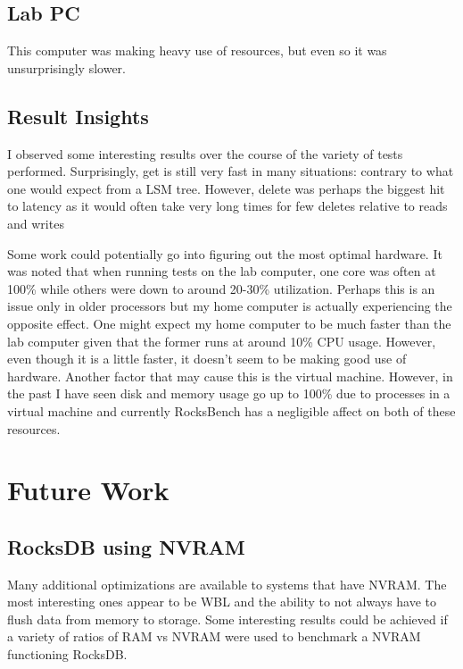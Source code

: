 \documentclass[twocolumn,11pt]{article}
\begin{document}
\subsection{Lab PC}

This computer was making heavy use of resources, but even so it was
unsurprisingly slower.

\subsection{Result Insights}
\label{subsec:res_insights}

I observed some interesting results over the course of the variety of tests
performed. Surprisingly, get is still very fast in many situations: contrary to
what one would expect from a LSM tree. However, delete was perhaps the biggest
hit to latency as it would often take very long times for few deletes relative
to reads and writes

Some work could potentially go into figuring out the most optimal hardware. It
was noted that when running tests on the lab computer, one core was often at
100\% while others were down to around 20-30\% utilization. Perhaps this is an
issue only in older processors but my home computer is actually experiencing the
opposite effect. One might expect my home computer to be much faster than the
lab computer given that the former runs at around 10\% CPU usage. However, even
though it is a little faster, it doesn't seem to be making good use of hardware.
Another factor that may cause this is the virtual machine. However, in the past
I have seen disk and memory usage go up to 100\% due to processes in a virtual
machine and currently RocksBench has a negligible affect on both of these
resources.

\section{Future Work}
\label{sec:future_work}

\subsection{RocksDB using NVRAM}

Many additional optimizations are available to systems that have NVRAM. The most
interesting ones appear to be WBL and the ability to not always have to flush
data from memory to storage. Some interesting results could be achieved if a
variety of ratios of RAM vs NVRAM were used to benchmark a NVRAM functioning
RocksDB.
\end{document}
